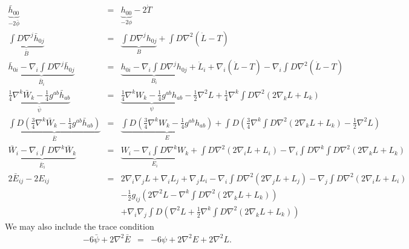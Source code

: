 \documentclass[10pt,letterpaper]{article}
\numberwithin{equation}{section}
\begin{document}
\begin{eqnarray}
\underbrace{\bar h_{00}}_{-2\bar\phi } &=& \underbrace{h_{00}}_{-2\phi} - 2\dot T
\nonumber\\
%
\underbrace{\int D \nabla^j \bar h_{0j}}_{\bar B} &=& \underbrace{\int D \nabla^j h_{0j}}_B + \int D \nabla^2(\dot L-T)
\nonumber\\
%
\underbrace{\bar h_{0i} - \nabla_i \int D \nabla^j \bar h_{0j}}_{\bar B_i} &=&
\underbrace{h_{0i} - \nabla_i \int D \nabla^j  h_{0j}}_{B_i} +\dot L_i + \nabla_i(\dot L -T)
	-\nabla_i \int D \nabla^2(\dot L-T)
\nonumber\\
%
\underbrace{\tfrac14 \nabla^k \bar W_k - \tfrac14 g^{ab}\bar h_{ab}}_{\bar\psi} &=& \underbrace{ \tfrac14 \nabla^k W_k - \tfrac14 g^{ab}h_{ab}}_{\psi} - \tfrac12 \nabla^2 L+  \tfrac14 \nabla^k \int D \nabla^2( 2\nabla_k L + L_k) 
\nonumber\\
\underbrace{\int D(\tfrac34 \nabla^k \bar W_k - \tfrac14 g^{ab}\bar h_{ab})}_{\bar E} &=&
\underbrace{\int D(\tfrac34 \nabla^k W_k - \tfrac14 g^{ab}h_{ab})}_{ E} 
+ \int D \left( \tfrac34 \nabla^k \int D \nabla^2 (2\nabla_k L + L_k) - \tfrac12 \nabla^2 L\right)
\nonumber\\
%
\underbrace{\bar W_i - \nabla_i \int D \nabla^k \bar W_k}_{\bar E_i}
&=&
\underbrace{ W_i - \nabla_i \int D \nabla^k W_k}_{ E_i}
+ \int D\nabla^2 (2 \nabla_i L + L_i) - \nabla_i \int D \nabla^k \int D\nabla^2 (2 \nabla_k L + L_k)
\nonumber\\
2\bar E_{ij} - 2E_{ij} &=&2\nabla_i \nabla_j L + \nabla_i L_j + \nabla_j L_i
-\nabla_i \int D\nabla^2 (2\nabla_j L + L_j) - \nabla_j \int D \nabla^2 (2\nabla_i L + L_i)
\nonumber\\
&&-\tfrac12 g_{ij}\left( 2 \nabla^2 L - \nabla^k \int D \nabla^2( 2\nabla_k L + L_k)\right)
\nonumber\\
&& + \nabla_i \nabla_j \int D \left( \nabla^2 L +\tfrac12 \nabla^k \int D \nabla^2 (2\nabla_k L +L_k)\right)
\label{svtgauge1}
\end{eqnarray}
We may also include the trace condition
\begin{eqnarray}
-6\bar \psi + 2\nabla^2 \bar E &=& -6 \psi + 2\nabla^2 E +2 \nabla^2 L.
\end{eqnarray}
\end{document}
